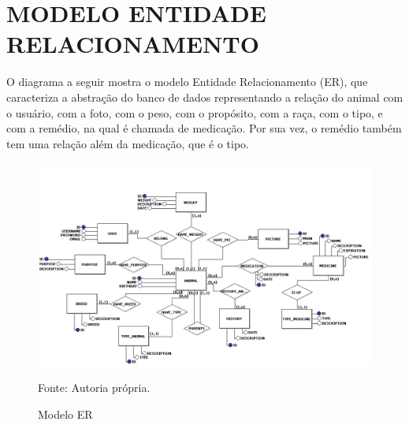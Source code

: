 \section{MODELO ENTIDADE RELACIONAMENTO}

O diagrama a seguir mostra o modelo Entidade Relacionamento (ER), que caracteriza a abstração do banco de dados representando a relação do animal com o usuário, com a foto, com o peso, com o propósito, com a raça, com o tipo, e com a remédio, na qual é chamada de medicação. Por sua vez, o remédio também tem uma relação além da medicação, que é o tipo.

\begin{figure}[H]
	\begin{center}
		\caption{Modelo ER}
		\includegraphics[width=\textwidth]{../img/erdoboi.jpg}

		Fonte: Autoria própria.
	\end{center}
	\label{er}
\end{figure}
